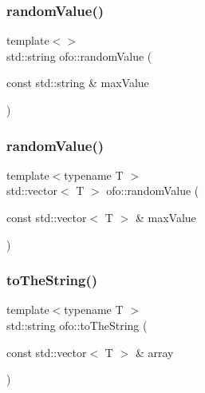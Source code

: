 \mbox{\label{namespaceofo_ab6b4775595276351b6c5485fa99649b3}} 
\subsubsection{\texorpdfstring{random\+Value()}{randomValue()}\hspace{0.1cm}{\footnotesize\ttfamily [3/4]}}
{\footnotesize\ttfamily template$<$$>$ \\
std\+::string ofo\+::random\+Value (\begin{DoxyParamCaption}\item[{const std\+::string \&}]{max\+Value }\end{DoxyParamCaption})}

\mbox{\label{namespaceofo_aeded67ad2a0018cf9fb55c1697c4ae87}} 
\subsubsection{\texorpdfstring{random\+Value()}{randomValue()}\hspace{0.1cm}{\footnotesize\ttfamily [4/4]}}
{\footnotesize\ttfamily template$<$typename T $>$ \\
std\+::vector$<$ T $>$ ofo\+::random\+Value (\begin{DoxyParamCaption}\item[{const std\+::vector$<$ T $>$ \&}]{max\+Value }\end{DoxyParamCaption})}

\mbox{\label{namespaceofo_a69e3fd282eb0698e75471037b3bf5c14}} 
\subsubsection{\texorpdfstring{to\+The\+String()}{toTheString()}\hspace{0.1cm}{\footnotesize\ttfamily [1/4]}}
{\footnotesize\ttfamily template$<$typename T $>$ \\
std\+::string ofo\+::to\+The\+String (\begin{DoxyParamCaption}\item[{const std\+::vector$<$ T $>$ \&}]{array }\end{DoxyParamCaption})}

